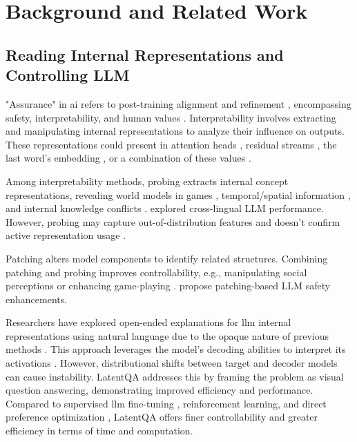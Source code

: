 \section{Background and Related Work}
\label{related-works}


\subsection{Reading Internal Representations and Controlling LLM}


"Assurance" in \ac{ai} refers to post-training alignment and refinement \cite{batarsehSurveyArtificialIntelligence2021}, encompassing safety, interpretability, and human values \cite{jiAIAlignmentComprehensive2024}. Interpretability involves extracting and manipulating internal representations to analyze their influence on outputs.
These representations could present in attention heads \cite{gould2023successor}, residual streams \cite{zhaoAnalysingResidualStream2024, nandaEmergentLinearRepresentations2023}, the last word's embedding \cite{ghandehariounPatchscopesUnifyingFramework2024}, or a combination of these values \cite{panLatentQATeachingLLMs2024}. 


Among interpretability methods, probing extracts internal concept representations, revealing world models in games \cite{nandaEmergentLinearRepresentations2023, karvonenEmergentWorldModels2024, ivanitskiyStructuredWorldRepresentations2023}, temporal/spatial information \cite{gurneeLanguageModelsRepresent2024}, and internal knowledge conflicts \cite{zhaoAnalysingResidualStream2024}.  \cite{liExploringMultilingualProbing2024} explored cross-lingual LLM performance. However, probing may capture out-of-distribution features and doesn't confirm active representation usage \cite{nandaEmergentLinearRepresentations2023}.


Patching alters model components to identify related structures. Combining patching and probing improves controllability, e.g., manipulating social perceptions \cite{chenDesigningDashboardTransparency2024} or enhancing game-playing \cite{karvonenEmergentWorldModels2024}. \cite{zhao2024towards} propose patching-based LLM safety enhancements.
  

Researchers have explored open-ended explanations for \ac{llm} internal representations using natural language due to the opaque nature of previous methods \cite{ghandehariounPatchscopesUnifyingFramework2024, katz2024backward}.  This approach leverages the model's decoding abilities to interpret its activations \cite{chenSelfIESelfInterpretationLarge2024, ghandehariounPatchscopesUnifyingFramework2024}. However, distributional shifts between target and decoder models can cause instability.  LatentQA \cite{panLatentQATeachingLLMs2024} addresses this by framing the problem as visual question answering, demonstrating improved efficiency and performance. Compared to supervised \ac{llm} fine-tuning \cite{ouyang2022training}, reinforcement learning, and direct preference optimization \cite{rafailov2024direct}, LatentQA offers finer controllability and greater efficiency in terms of time and computation.


